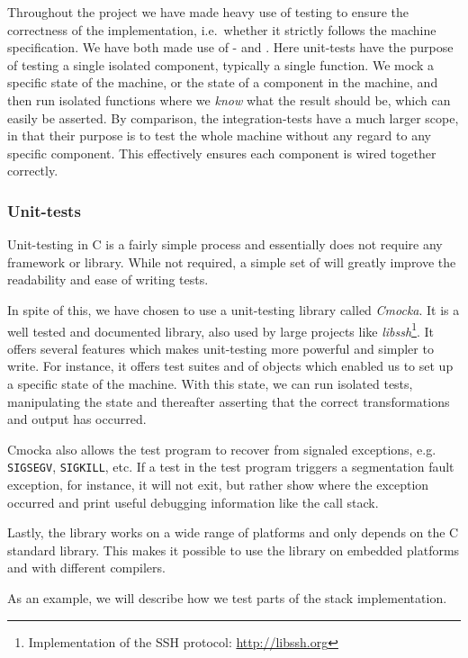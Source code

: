 Throughout the project we have made heavy use of testing to ensure the
correctness of the implementation, i.e.~whether it strictly follows the machine
specification. We have both made use of - and
. Here unit-tests have the purpose of testing a single
isolated component, typically a single function. We mock a specific state of the
machine, or the state of a component in the machine, and then run isolated
functions where we {\it know} what the result should be, which can easily be
asserted. By comparison, the integration-tests have a much larger scope, in that
their purpose is to test the whole machine without any regard to any specific
component. This effectively ensures each component is wired together correctly.

\subsubsection{Unit-tests}

Unit-testing in C is a fairly simple process and essentially does not require
any framework or library. While not required, a simple set of  will
greatly improve the readability and ease of writing tests.

In spite of this, we have chosen to use a unit-testing library called {\it
  Cmocka}\cite{cmocka}. It is a well tested and documented library, also used by
large projects like {\it libssh}\footnote{Implementation of the SSH protocol:
  \url{http://libssh.org}}. It offers several features which makes unit-testing
more powerful and simpler to write. For instance, it offers test suites and
 of objects which enabled us to set up a specific state of the
machine. With this state, we can run isolated tests, manipulating the state and
thereafter asserting that the correct transformations and output has occurred.

Cmocka also allows the test program to recover from signaled exceptions,
e.g. {\tt SIGSEGV}, {\tt SIGKILL}, etc. If a test in the test program triggers a
segmentation fault exception, for instance, it will not exit, but rather show
where the exception occurred and print useful debugging information like the
call stack.

Lastly, the library works on a wide range of platforms and only depends on the C
standard library. This makes it possible to use the library on embedded
platforms and with different compilers.

As an example, we will describe how we test parts of the stack implementation.

